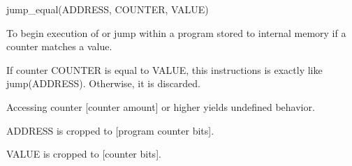 

\format
jump\_equal(ADDRESS, COUNTER, VALUE)

\purpose

To begin execution of or jump within a program stored to internal memory if a counter matches a value.

\description

If counter COUNTER is equal to VALUE, this instructions is exactly like jump(ADDRESS).
Otherwise, it is discarded.

\notes

Accessing counter [counter amount] or higher yields undefined behavior.

ADDRESS is cropped to [program counter bits].

VALUE is cropped to [counter bits].
